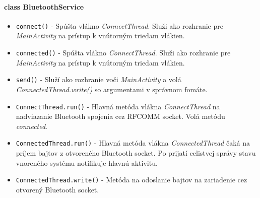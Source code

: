 \documentclass[12pt, a4paper]{article}
\begin{document}
\paragraph{class BluetoothService}
\begin{itemize}
\itemsep0pt
\item \verb|connect()| - Spúšta vlákno \emph{ConnectThread}. Služi ako rozhranie pre \emph{MainActivity} na prístup k vnútorným triedam vlákien.
\item \verb|connected()| - Spúšta vlákno \emph{ConnectThread}. Služi ako rozhranie pre \emph{MainActivity} na prístup k vnútorným triedam vlákien.
\item \verb|send()| - Služí ako rozhranie voči \emph{MainActivity} a volá \emph{ConnectedThread.write()} so argumentami v správnom fomáte.
\item \verb|ConnectThread.run()| - Hlavná metóda vlákna \emph{ConnectThread} na nadviazanie Bluetooth spojenia cez RFCOMM socket. Volá metódu \emph{connected}. 
\item \verb|ConnectedThread.run()|  - Hlavná metóda vlákna \emph{ConnectedThread} čaká na príjem bajtov z otvoreného Bluetooth socket. Po prijatí celistvej správy stavu vnoreného systému notifikuje hlavnú aktivitu.
\item \verb|ConnectedThread.write()| - Metóda na odoslanie bajtov na zariadenie cez otvorený Bluetooth socket.
\end{itemize}
\end{document}
